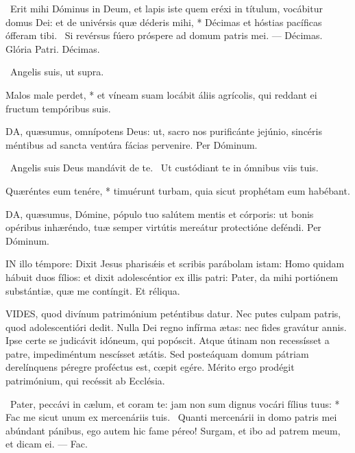 \R\ Erit mihi Dóminus in Deum, et lapis iste quem eréxi in títulum, vocábitur domus Dei: et de univérsis quæ déderis mihi, * Décimas et hóstias pacíficas ófferam tibi. \V\ Si revérsus fúero próspere ad domum patris mei. --- Décimas. Glória Patri. Décimas.

\V\ Angelis suis, ut supra.

 Malos male perdet, * et víneam suam locábit áliis agrícolis, qui reddant ei fructum tempóribus suis.


\lettrine[lines=2]{D}{A}, quæsumus, omnípotens Deus: ut, sacro nos purificánte jejúnio, sincéris méntibus ad sancta ventúra fácias pervenire. Per Dóminum.

\V\ Angelis suis Deus mandávit de te. \R\ Ut custódiant te in ómnibus viis tuis.

 Quæréntes eum tenére, * timuérunt turbam, quia sicut prophétam eum habébant.


\lettrine[lines=2]{D}{A}, quæsumus, Dómine, pópulo tuo salútem mentis et córporis: ut bonis opéribus inhæréndo, tuæ semper virtútis mereátur protectióne deféndi. Per Dóminum.

\sectionornament




\lettrine[lines=2]{I}{N} illo témpore: Dixit Jesus pharisǽis et scribis parábolam istam: Homo quidam hábuit duos fílios: et dixit adolescéntior ex illis patri: Pater, da mihi portiónem substántiæ, quæ me contíngit. Et réliqua.



\lettrine[lines=2]{V}{IDES}, quod divínum patrimónium peténtibus datur. Nec putes culpam patris, quod adolescentióri dedit. Nulla Dei regno infírma ætas: nec fides gravátur annis. Ipse certe se judicávit idóneum, qui popóscit. Atque útinam non recessísset a patre, impediméntum nescísset ætátis. Sed posteáquam domum pátriam derelínquens péregre proféctus est, cœpit egére. Mérito ergo prodégit patrimónium, qui recéssit ab Ecclésia.

\R\ Pater, peccávi in cælum, et coram te: jam non sum dignus vocári fílius tuus: * Fac me sicut unum ex mercenáriis tuis. \V\ Quanti mercenárii in domo patris mei abúndant pánibus, ego autem hic fame péreo! Surgam, et ibo ad patrem meum, et dicam ei. --- Fac.

